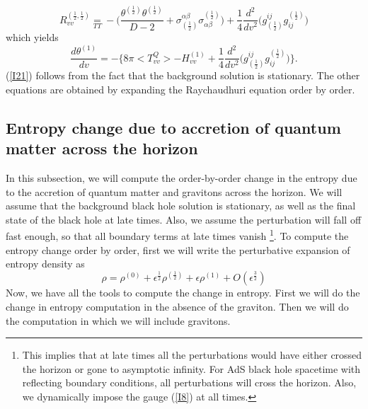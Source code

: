 \documentclass[12pt]{article}
\begin{document}
\begin{equation}\label{I24b}
R^{(\frac{1}{2},\frac{1}{2})}_{vv} \underset{TT}{=} - \Big(\frac{\theta^{(\frac{1}{2})} \theta^{(\frac{1}{2})}}{D-2} + \sigma^{\alpha \beta}_{(\frac{1}{2})} \sigma_{\alpha \beta}^{(\frac{1}{2})}\Big) +\frac{1}{4}\frac{d^2}{dv^2}\Big(g^{ij}_{(\frac{1}{2})}g_{ij}^{(\frac{1}{2})}\Big)
\end{equation}
which yields
\begin{equation}\label{I25}
\frac{d\theta^{(1)}}{dv}=-\Big\{ 8\pi <T^Q_{vv}> - H^{(1)}_{vv} +\frac{1}{4}\frac{d^2}{dv^2}\Big(g^{ij}_{(\frac{1}{2})}g_{ij}^{(\frac{1}{2})}\Big) \Big\}.
\end{equation}
(\ref{I21}) follows from the fact that the background solution is stationary. The other equations are obtained by expanding the Raychaudhuri equation order by order.
\subsection{Entropy change due to accretion of quantum matter across the horizon}
In this subsection, we will compute the order-by-order change in the entropy due to the accretion of quantum matter and gravitons across the horizon. We will assume that the background black hole solution is stationary, as well as the final state of the black hole at late times. Also, we assume the perturbation will fall off fast enough, so that all boundary terms at late times vanish \footnote{This implies that at late times all the perturbations would have either crossed the horizon or gone to asymptotic infinity. For AdS black hole spacetime with reflecting boundary conditions, all perturbations will cross the horizon. Also, we dynamically impose the gauge (\ref{I8}) at all times. }. To compute the entropy change order by order, first we will write the perturbative expansion of entropy density as
\begin{equation}\label{I26}
\rho= \rho^{(0)}+ \epsilon^{\frac{1}{2}} \rho^{(\frac{1}{2})}+ \epsilon \rho^{(1)}+ O(\epsilon^{\frac{3}{2}} )
\end{equation}
Now, we have all the tools to compute the change in entropy. First we will do the change in entropy computation in the absence of the graviton. Then we will do the computation in which we will include gravitons.
\end{document}
